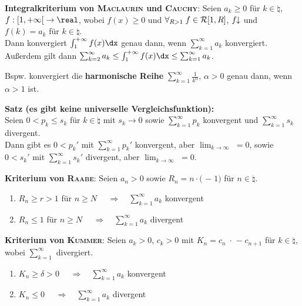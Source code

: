 \textbf{Integralkriterium von \textsc{Maclaurin} und \textsc{Cauchy}}:
Seien $a_k \ge 0$ für $k \in \natural$, \\
$f: \left[1,+\infty\right[ \rightarrow \real$, wobei $f(x) \ge 0$
und $\forall_{R > 1}\; f \in \mathcal{R}[1,R]$, $f\!\!\downarrow$ und $f(k) = a_k$
für $k \in \natural$. \\
Dann konvergiert $\int_1^{+\infty} f(x)\dx$ genau dann, wenn
$\sum_{k=1}^\infty a_k$ konvergiert. \\
Außerdem gilt dann $\sum_{k=2}^\infty a_k \le \int_1^{+\infty} f(x)\dx \le
\sum_{k=1}^\infty a_k$.

Bspw. konvergiert die \textbf{harmonische Reihe}
$\sum_{k=1}^\infty \frac{1}{k^\alpha}$, $\alpha > 0$ genau dann, wenn
$\alpha > 1$ ist.

\linie

\textbf{Satz (es gibt keine universelle Vergleichsfunktion):} \\
Seien $0 < p_k \le s_k$ für $k \in \natural$ mit $s_k \to 0$
sowie $\sum_{k=1}^\infty p_k$ konvergent und $\sum_{k=1}^\infty s_k$
divergent. \\
Dann gibt es $0 < p_k'$ mit
$\sum_{k=1}^\infty p_k'$ konvergent, aber
$\lim_{k \to \infty}$  $= 0$, sowie \\
$0 < s_k'$ mit
$\sum_{k=1}^\infty s_k'$ divergent, aber
$\lim_{k \to \infty}$  $= 0$.

\linie

\textbf{Kriterium von \textsc{Raabe}}:
Seien $a_n > 0$ sowie $R_n = n \cdot \Big($%
 $-\; 1\Big)$
für $n \in \natural$.
\begin{enumerate}
    \item $R_n \ge r > 1$ für $n \ge N$
    $\quad\Rightarrow\quad \sum_{k=1}^\infty a_k$ konvergent

    \item $R_n \le 1$ für $n \ge N$
    $\quad\Rightarrow\quad \sum_{k=1}^\infty a_k$ divergent
\end{enumerate}

\textbf{Kriterium von \textsc{Kummer}}:
Seien $a_k > 0$, $c_k > 0$ mit $K_n = c_n \;\cdot$
 $-\; c_{n+1}$ für $k \in \natural$,
wobei $\sum_{k=1}^\infty$  divergiert.
\begin{enumerate}
    \item $K_n \ge \delta > 0$
    $\quad\Rightarrow\quad \sum_{k=1}^\infty a_k$ konvergent

    \item $K_n \le 0$
    $\quad\Rightarrow\quad \sum_{k=1}^\infty a_k$ divergent
\end{enumerate}

